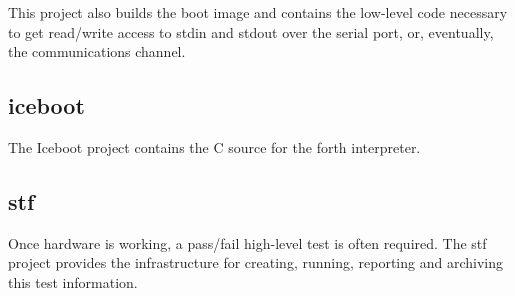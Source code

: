 \documentclass{article}
\begin{document}
This project also builds the boot image and contains the
low-level code necessary to get read/write access to stdin
and stdout over the serial port, or, eventually, the communications
channel.
                        
        \subsection{iceboot}

The Iceboot project contains the C source for
the forth interpreter.

        \subsection{stf}

 Once hardware is working, a pass/fail high-level test
is often required.  The stf project provides the infrastructure
for creating, running, reporting and archiving this test
information.

\printindex
\end{document}
